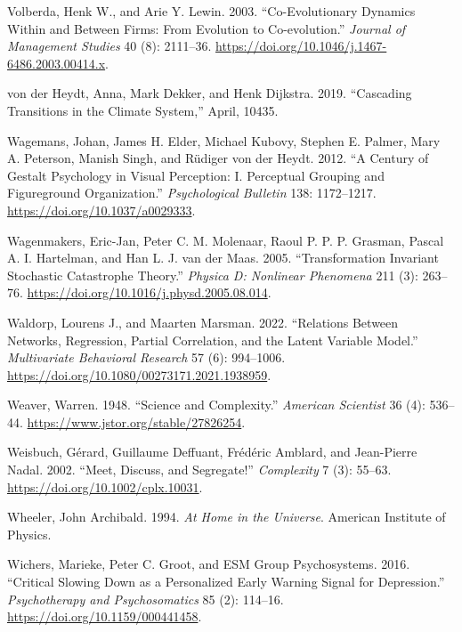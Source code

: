 \documentclass[
  a4paper,
  DIV=11,
  numbers=noendperiod,
  oneside]{scrreprt}
\newlength{\cslhangindent}
\newenvironment{CSLReferences}[2] %
 {\begin{list}{}{%
  \setlength{\itemindent}{0pt}
  \setlength{\leftmargin}{0pt}
  \setlength{\parsep}{0pt}
  \ifodd #1
   \setlength{\leftmargin}{\cslhangindent}
   \setlength{\itemindent}{-1\cslhangindent}
  \fi
  \setlength{\itemsep}{#2\baselineskip}}}
 {\end{list}}
\begin{document}
\begin{CSLReferences}{1}{0}
Volberda, Henk W., and Arie Y. Lewin. 2003. {``Co-Evolutionary {Dynamics
Within} and {Between Firms}: {From Evolution} to {Co-evolution}.''}
\emph{Journal of Management Studies} 40 (8): 2111--36.
\url{https://doi.org/10.1046/j.1467-6486.2003.00414.x}.

von der Heydt, Anna, Mark Dekker, and Henk Dijkstra. 2019. {``Cascading
Transitions in the Climate System,''} April, 10435.

Wagemans, Johan, James H. Elder, Michael Kubovy, Stephen E. Palmer, Mary
A. Peterson, Manish Singh, and Rüdiger von der Heydt. 2012. {``A Century
of {Gestalt} Psychology in Visual Perception: {I}. {Perceptual} Grouping
and Figure\textendash ground Organization.''} \emph{Psychological
Bulletin} 138: 1172--1217. \url{https://doi.org/10.1037/a0029333}.

Wagenmakers, Eric-Jan, Peter C. M. Molenaar, Raoul P. P. P. Grasman,
Pascal A. I. Hartelman, and Han L. J. van der Maas. 2005.
{``Transformation Invariant Stochastic Catastrophe Theory.''}
\emph{Physica D: Nonlinear Phenomena} 211 (3): 263--76.
\url{https://doi.org/10.1016/j.physd.2005.08.014}.

Waldorp, Lourens J., and Maarten Marsman. 2022. {``Relations Between
{Networks}, {Regression}, {Partial Correlation}, and the {Latent
Variable Model}.''} \emph{Multivariate Behavioral Research} 57 (6):
994--1006. \url{https://doi.org/10.1080/00273171.2021.1938959}.

Weaver, Warren. 1948. {``Science and {Complexity}.''} \emph{American
Scientist} 36 (4): 536--44. \url{https://www.jstor.org/stable/27826254}.

Weisbuch, Gérard, Guillaume Deffuant, Frédéric Amblard, and Jean-Pierre
Nadal. 2002. {``Meet, Discuss, and Segregate!''} \emph{Complexity} 7
(3): 55--63. \url{https://doi.org/10.1002/cplx.10031}.

Wheeler, John Archibald. 1994. \emph{At {Home} in the {Universe}}.
{American Institute of Physics}.

Wichers, Marieke, Peter C. Groot, and ESM Group Psychosystems. 2016.
{``Critical {Slowing Down} as a {Personalized Early Warning Signal} for
{Depression}.''} \emph{Psychotherapy and Psychosomatics} 85 (2):
114--16. \url{https://doi.org/10.1159/000441458}.


\end{CSLReferences}
\end{document}
